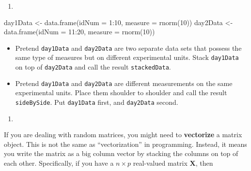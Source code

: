 \documentclass[
  12pt,
  krantz2]{krantz}
\makeatletter
\newenvironment{Shaded}{\begin{snugshade}}{\end{snugshade}}
\newcommand{\AttributeTok}[1]{\textcolor[rgb]{0.61,0.61,0.61}{#1}}
\newcommand{\DecValTok}[1]{\textcolor[rgb]{0.06,0.06,0.06}{#1}}
\newcommand{\FunctionTok}[1]{\textcolor[rgb]{0,0,0}{#1}}
\newcommand{\NormalTok}[1]{#1}
\newcommand{\OtherTok}[1]{\textcolor[rgb]{0.37,0.37,0.37}{#1}}
\newcommand{\SpecialCharTok}[1]{\textcolor[rgb]{0,0,0}{#1}}
\providecommand{\tightlist}{%
  \setlength{\itemsep}{0pt}\setlength{\parskip}{0pt}}
\newenvironment{kframe}{%
\medskip{}
\setlength{\fboxsep}{.8em}
 \def\at@end@of@kframe{}%
 \ifinner\ifhmode%
  \def\at@end@of@kframe{\end{minipage}}%
  \begin{minipage}{\columnwidth}%
 \fi\fi%
 \def\FrameCommand##1{\hskip\@totalleftmargin \hskip-\fboxsep
 \colorbox{shadecolor}{##1}\hskip-\fboxsep
     \hskip-\linewidth \hskip-\@totalleftmargin \hskip\columnwidth}%
 \MakeFramed {\advance\hsize-\width
   \@totalleftmargin\z@ \linewidth\hsize
   \@setminipage}}%
 {\par\unskip\endMakeFramed%
 \at@end@of@kframe}
\renewenvironment{Shaded}{\begin{kframe}}{\end{kframe}}
\makeatother
\begin{document}
\begin{enumerate}
\def\labelenumi{\arabic{enumi}.}
\setcounter{enumi}{1}
\tightlist
\item
\end{enumerate}

\begin{Shaded}
\begin{Highlighting}[]
\NormalTok{day1Data }\OtherTok{\textless{}{-}} \FunctionTok{data.frame}\NormalTok{(}\AttributeTok{idNum =} \DecValTok{1}\SpecialCharTok{:}\DecValTok{10}\NormalTok{, }
                       \AttributeTok{measure =} \FunctionTok{rnorm}\NormalTok{(}\DecValTok{10}\NormalTok{))}
\NormalTok{day2Data }\OtherTok{\textless{}{-}} \FunctionTok{data.frame}\NormalTok{(}\AttributeTok{idNum =} \DecValTok{11}\SpecialCharTok{:}\DecValTok{20}\NormalTok{, }
                       \AttributeTok{measure =} \FunctionTok{rnorm}\NormalTok{(}\DecValTok{10}\NormalTok{))}
\end{Highlighting}
\end{Shaded}

\begin{itemize}
\tightlist
\item
  Pretend \texttt{day1Data} and \texttt{day2Data} are two separate data sets that possess the same type of measures but on different experimental units. Stack \texttt{day1Data} on top of \texttt{day2Data} and call the result \texttt{stackedData}.
\item
  Pretend \texttt{day1Data} and \texttt{day2Data} are different measurements on the same experimental units. Place them shoulder to shoulder and call the result \texttt{sideBySide}. Put \texttt{day1Data} first, and \texttt{day2Data} second.
\end{itemize}

\begin{enumerate}
\def\labelenumi{\arabic{enumi}.}
\setcounter{enumi}{2}
\tightlist
\item
\end{enumerate}

If you are dealing with random matrices, you might need to \textbf{vectorize} a matrix object. This is not the same as ``vectorization'' in programming. Instead, it means you write the matrix as a big column vector by stacking the columns on top of each other. Specifically, if you have a \(n \times p\) real-valued matrix \(\mathbf{X}\), then
\end{document}
